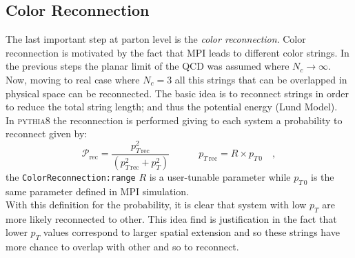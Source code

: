 \subsection{Color Reconnection}

The last important step at parton level is the \textit{color reconnection}. Color reconnection is motivated by the fact that MPI leads to different color strings. In the previous steps the planar limit of the QCD was assumed where $N_c\rightarrow\infty$. Now, moving to real case where $N_c=3$ all this strings that can be overlapped in physical space can be reconnected. The basic idea is to reconnect strings in order to reduce the total string length; and thus the potential energy (Lund Model).
\\
In \textsc{pythia8} the reconnection is performed giving to each system a probability to reconnect given by:
\begin{equation}
	\mathcal{P}_{\text{rec}}=\frac{p_{T\,\text{rec}}^2}{\left(p_{T\,\text{rec}}^2 + p_T^2\right)} \qquad\quad p_{T\,\text{rec}}=R\times p_{T\,0}\quad,
\end{equation} 
the \texttt{ColorReconnection:range} $R$ is a user-tunable parameter while $p_{T\,0}$ is the same parameter defined in MPI simulation.
\\
With this definition for the probability, it is clear that system with low $p_T$ are more likely reconnected to other. This idea find is justification in the fact that lower $p_T$ values correspond to larger spatial extension and so these strings have more chance to overlap with other and so to reconnect.

